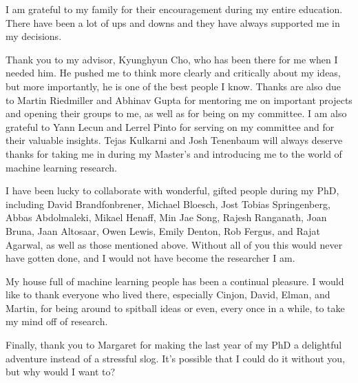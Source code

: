 I am grateful to my family for their encouragement during my entire education.
There have been a lot of ups and downs and they have always supported me in my decisions.

Thank you to my advisor, Kyunghyun Cho, who has been there for me when I needed him.
He pushed me to think more clearly and critically about my ideas, but more importantly, he is one of the best people I know.
Thanks are also due to Martin Riedmiller and Abhinav Gupta for mentoring me on important projects and opening their groups to me, as well as for being on my committee.
I am also grateful to Yann Lecun and Lerrel Pinto for serving on my committee and for their valuable insights.
Tejas Kulkarni and Josh Tenenbaum will always deserve thanks for taking me in during my Master's and introducing me to the world of machine learning research.

I have been lucky to collaborate with wonderful, gifted people during my PhD, including David Brandfonbrener, Michael Bloesch, Jost Tobias Springenberg, Abbas Abdolmaleki, Mikael Henaff, Min Jae Song, Rajesh Ranganath, Joan Bruna, Jaan Altosaar, Owen Lewis, Emily Denton, Rob Fergus, and Rajat Agarwal, as well as those mentioned above.
Without all of you this would never have gotten done, and I would not have become the researcher I am.

My house full of machine learning people has been a continual pleasure.
I would like to thank everyone who lived there, especially Cinjon, David, Elman, and Martin, for being around to spitball ideas or even, every once in a while, to take my mind off of research.

Finally, thank you to Margaret for making the last year of my PhD a delightful adventure instead of a stressful slog.
It's possible that I could do it without you, but why would I want to?
